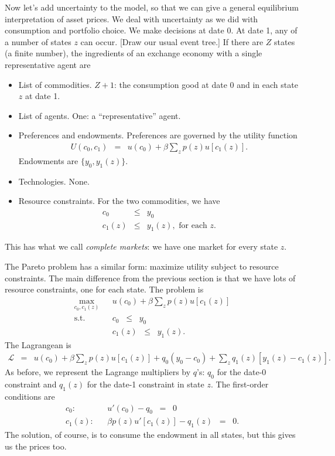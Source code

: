 \documentclass[11pt]{article}
\begin{document}
Now let's add uncertainty to the model, so that we can give a general
equilibrium interpretation of asset prices.
We deal with uncertainty as we did with consumption and portfolio choice.
We make decisions at date 0.
At date 1, any of a number of states $z$ can occur.
[Draw our usual event tree.]
If there are $Z$ states (a finite number), the ingredients of
an exchange economy with a single representative agent are
\begin{itemize}
\item List of commodities.  $Z+1$:  the consumption good at date 0
and in each state $z$ at date 1.
\item List of agents.  One: a ``representative'' agent.
\item Preferences and endowments.  Preferences are governed by the utility function
\begin{eqnarray*}
    U(c_0,c_1) &=& u(c_0) + \beta \sum_z p(z) u[c_1(z)] .
\end{eqnarray*}
Endowments are $\{y_0,y_1(z)\}$.
\item Technologies.  None.
\item Resource constraints.  For the two commodities,
we have
\begin{eqnarray*}
    c_0 &\leq& y_0 \\
    c_1(z) &\leq& y_1(z), \mbox{ for each } z .
\end{eqnarray*}
\end{itemize}
This has what we call {\it complete markets\/}:  we have one market for every state $z$.

The Pareto problem has a similar form:  maximize utility subject to
resource constraints.
The main difference from the previous section is that we have lots of resource
constraints, one for each state.
The problem is
\begin{eqnarray*}
    \max_{c_0,c_1(z)} && u(c_0) + \beta \sum_z p(z) u[c_1(z)] \\
    \mbox{s.t.}   &&  c_0  \;\;\leq\;\; y_0 \\
                  &&  c_1(z) \;\;\leq\;\; y_1(z) .
\end{eqnarray*}
The Lagrangean is
\begin{eqnarray*}
    \mathcal{L} &=&  u(c_0) + \beta \sum_z p(z) u[c_1(z)] + q_0 (y_0 - c_0)
                    + \sum_z q_1(z)  [ y_1(z) - c_1(z)]  .
\end{eqnarray*}
As before, we represent the Lagrange multipliers by $q$'s:
$q_0$ for the date-0 constraint and $q_1(z)$ for the date-1 constraint in state $z$.
The first-order conditions are
\begin{eqnarray*}
    c_0: &&  u'(c_0) - q_0 \;\;=\;\; 0 \\
    c_1(z): &&  \beta p(z) u'[c_1(z)] - q_1(z) \;\;=\;\; 0 .
\end{eqnarray*}
The solution, of course, is to consume the endowment in all states,
but this gives us the prices too.
\end{document}
